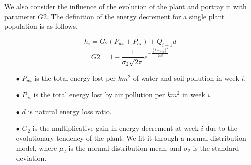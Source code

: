 \documentclass[12pt]{article}  %
\newenvironment{shrinkeq}[1]
{ \bgroup
	\addtolength\abovedisplayshortskip{#1}
	\addtolength\abovedisplayskip{#1}
	\addtolength\belowdisplayshortskip{#1}
	\addtolength\belowdisplayskip{#1}}
{\egroup\ignorespacesafterend}
\begin{document}
\vspace{-0.2cm}
We also consider the influence of the evolution of the plant and portray it with parameter $G2$. The definition of the energy decrement for a single plant population is as follows.
\vspace{-0.3cm}

\begin{shrinkeq}{-1ex}
	\begin{equation}
    \label{eq:eq7}
	    h_i=G_2(P_{wi}+P_{ai})+Q_{i-1}d
	\end{equation}
\end{shrinkeq}
\vspace{-0.1cm}
\begin{shrinkeq}{-1ex}
	\begin{equation}
    \label{eq:eq8}
	    G2 = 1-\frac{1}{\sigma_2\sqrt{2\pi}}e^{-\frac{(t-\mu_2)^2}{2\sigma_2^2}}
	\end{equation}
\end{shrinkeq}

\begin{itemize}
\vspace{-0.3cm}
\item[$\bullet$] \textbf{$P_{wi}$ }is the total energy lost per $km^2$ of water and soil pollution in week $i$.
\vspace{-0.2cm}
\item[$\bullet$] \textbf{$P_{ai}$ }is the total energy lost by air pollution per $km^2$ in week $i$.
\vspace{-0.2cm}
\item[$\bullet$] \textbf{$d$ }is natural energy loss ratio.
\vspace{-0.2cm}
\item[$\bullet$] \textbf{$G_2$ }is the multiplicative gain in energy decrement at week $i$ due to the evolutionary tendency of the plant. We fit it through a normal distribution model, where $\mu_2$ is the normal distribution mean, and $\sigma_2$ is the standard deviation.
\end{itemize}
\end{document}
